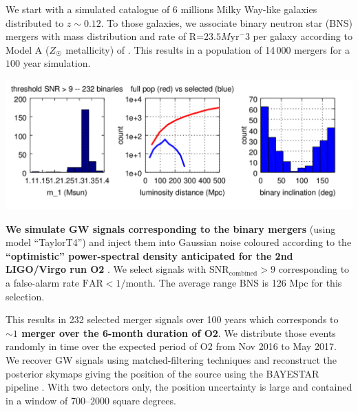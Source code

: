 \documentclass[a0,portrait]{a0poster}
\renewcommand{\emph}[1]{\textbf{\color{blue}#1}}
\begin{document}
\begin{multicols}{2}
We start with a simulated catalogue of 6 millions Milky Way-like galaxies
distributed to $z\sim 0.12$. To those galaxies, we associate binary neutron star
(BNS) mergers with mass distribution and rate of R=$23.5 M\mathrm{yr}^-3$ per galaxy
according to Model A ($Z_{\astrosun}$ metallicity) of
\cite{dominik12:_doubl_compac_objec}. This results in a population of 14\,000
mergers for a $100$ year simulation.

\begin{center}
    \includegraphics[width=30cm]{figures/summary_plot.png}
\end{center}
\vspace*{-0.8cm}

\emph{We simulate GW signals corresponding to the binary mergers} (using model
``TaylorT4'') and inject them into Gaussian noise coloured according to the
\emph{``optimistic'' power-spectral density anticipated for the 2nd LIGO/Virgo run O2}
\cite{lrr-2016-1}. We select signals with $\mathrm{SNR}_{\mathrm{combined}} > 9$
corresponding to a false-alarm rate $\mathrm{FAR} < 1/\mathrm{month}$. The
average range BNS is 126 Mpc for this selection.

This results in 232 selected merger signals over 100 years which corresponds to
\emph{$\sim 1$ merger over the 6-month duration of O2}. We distribute those events
randomly in time over the expected period of O2 from Nov 2016 to May 2017. We
recover GW signals using matched-filtering techniques and reconstruct the
posterior skymaps giving the position of the source using the BAYESTAR pipeline
\cite{PhysRevD.93.024013}.  With two detectors only, the position uncertainty is
large and contained in a window of 700--2000 square degrees.



\end{multicols}
\end{document}
